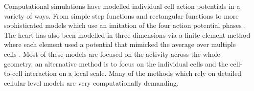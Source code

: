 Computational simulations have modelled individual cell action potentials in a variety of ways. From simple step functions  \citep{stepfunction} and rectangular functions \citep{retangularfunction} to more sophisticated models which use an imitation of the four action potential phases \citep{imitationactionpotential}. The heart has also been modelled in three dimensions via a finite element method where each element used a potential that mimicked the average over multiple cells \citep{averageovercells}. Most of these models are focused on the activity across the whole geometry, an alternative method is to focus on the individual cells and the cell-to-cell interaction on a local scale. Many of the methods which rely on detailed cellular level models are very computationally demanding. \par

